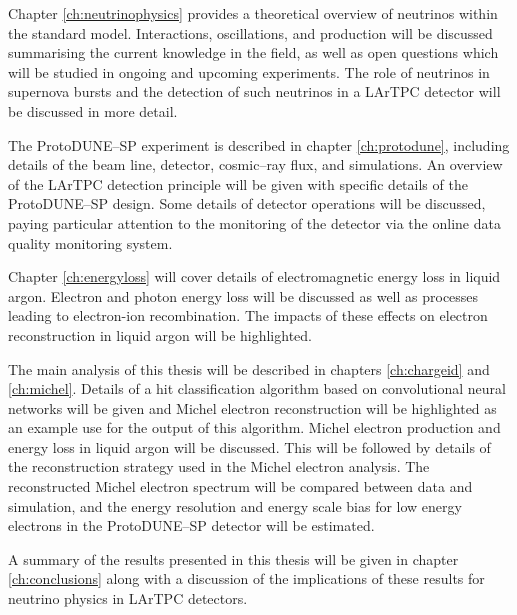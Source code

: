 Chapter \ref{ch:neutrinophysics} provides a theoretical overview of neutrinos
within the standard model. Interactions, oscillations, and production will be
discussed summarising the current knowledge in the field, as well as open
questions which will be studied in ongoing and upcoming experiments. The role of
neutrinos in supernova bursts and the detection of such neutrinos in a LArTPC
detector will be discussed in more detail.

The ProtoDUNE--SP experiment is described in chapter \ref{ch:protodune},
including details of the beam line, detector, cosmic--ray flux, and simulations.
An overview of the LArTPC detection principle will be given with specific
details of the ProtoDUNE--SP design. Some details of detector operations will be
discussed, paying particular attention to the monitoring of the detector via the
online data quality monitoring system.

Chapter \ref{ch:energyloss} will cover details of electromagnetic energy loss
in liquid argon. Electron and photon energy loss will be discussed as well as
processes leading to electron-ion recombination. The impacts of these effects on
electron reconstruction in liquid argon will be highlighted.

The main analysis of this thesis will be described in chapters
\ref{ch:chargeid} and \ref{ch:michel}. Details of a hit classification
algorithm based on convolutional neural networks will be given and Michel
electron reconstruction will be highlighted as an example use for the output of
this algorithm. Michel electron production and energy loss in liquid argon will
be discussed. This will be followed by details of the reconstruction strategy
used in the Michel electron analysis. The reconstructed Michel electron spectrum
will be compared between data and simulation, and the energy resolution and
energy scale bias for low energy electrons in the ProtoDUNE--SP detector will be
estimated. 

A summary of the results presented in this thesis will be given in chapter
\ref{ch:conclusions} along with a discussion of the implications of these
results for neutrino physics in LArTPC detectors.
